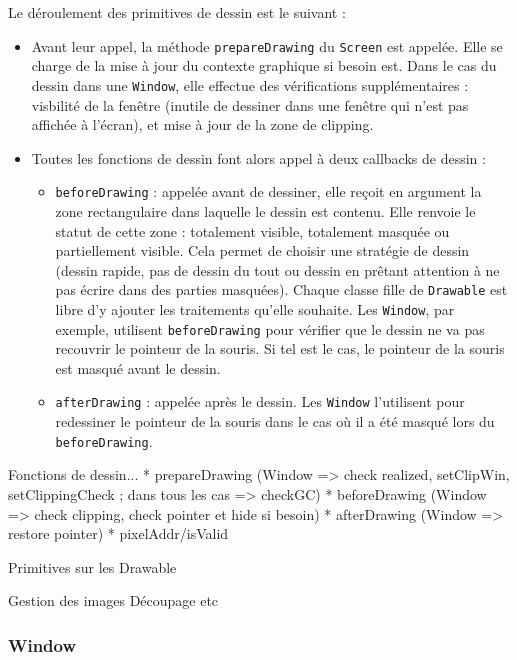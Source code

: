Le déroulement des primitives de dessin est le suivant :
\begin{itemize}
  \item Avant leur appel, la méthode \verb|prepareDrawing| du \verb|Screen| est appelée. Elle se charge de la mise à jour du contexte graphique si besoin est. Dans le cas du dessin dans une \verb|Window|, elle effectue des vérifications supplémentaires : visbilité de la fenêtre (inutile de dessiner dans une fenêtre qui n'est pas affichée à l'écran), et mise à jour de la zone de clipping.
  \item Toutes les fonctions de dessin font alors appel à deux callbacks de dessin :
    \begin{itemize}
      \item \verb|beforeDrawing| : appelée avant de dessiner, elle reçoit en argument la zone rectangulaire dans laquelle le dessin est contenu. Elle renvoie le statut de cette zone : totalement visible, totalement masquée ou partiellement visible. Cela permet de choisir une stratégie de dessin (dessin rapide, pas de dessin du tout ou dessin en prêtant attention à ne pas écrire dans des parties masquées). Chaque classe fille de \verb|Drawable| est libre d'y ajouter les traitements qu'elle souhaite. Les \verb|Window|, par exemple, utilisent \verb|beforeDrawing| pour vérifier que le dessin ne va pas recouvrir le pointeur de la souris. Si tel est le cas, le pointeur de la souris est masqué avant le dessin.
      \item \verb|afterDrawing| : appelée après le dessin. Les \verb|Window| l'utilisent pour redessiner le pointeur de la souris dans le cas où il a été masqué lors du \verb|beforeDrawing|.
    \end{itemize}
\end{itemize}

Fonctions de dessin...
* prepareDrawing (Window => check realized, setClipWin, setClippingCheck ; dans tous les cas => checkGC)
* beforeDrawing (Window => check clipping, check pointer et hide si besoin)
* afterDrawing (Window => restore pointer)
* pixelAddr/isValid

Primitives sur les Drawable

Gestion des images
Découpage etc


\subsubsection{Window}

